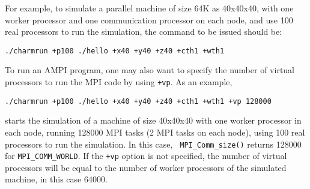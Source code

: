 For example, to simulate a parallel machine of size 64K as 40x40x40, with one
worker processor and one communication processor on each node, and use 100 real
processors to run the simulation, the command to be issued should be:
\begin{verbatim}
./charmrun +p100 ./hello +x40 +y40 +z40 +cth1 +wth1
\end{verbatim}

To run an AMPI program, one may also want to specify the number of virtual
processors to run the MPI code by using {\tt +vp}. As an example,
\begin{verbatim}
./charmrun +p100 ./hello +x40 +y40 +z40 +cth1 +wth1 +vp 128000
\end{verbatim}
\noindent starts the simulation of a machine   of size 40x40x40 with one worker
processor in each node, running 128000 MPI tasks (2 MPI tasks on each node),
using 100 real processors to run the simulation. In this case, {\tt
MPI\_Comm\_size()} returns 128000 for {\tt MPI\_COMM\_WORLD}.  If the {\tt +vp}
option is not specified, the number of virtual processors will be equal to the
number of worker processors of the simulated machine, in this case 64000.

